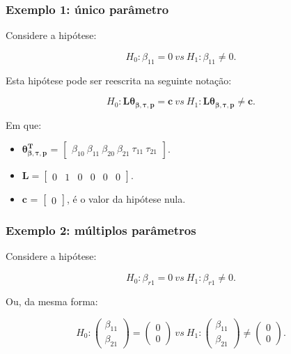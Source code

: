 \documentclass[10pt,
  aspectratio=169,
  serif,
  mathserif,
  professionalfont,
  compress,
  handout,
  ]{beamer}\usepackage[]{graphicx}\usepackage[]{color}
\begin{document}
\begin{frame}

\frametitle{Exemplo 1: único parâmetro}

Considere a hipótese:

$$H_0: \beta_{11} = 0 \ vs \ H_1: \beta_{11} \neq 0.$$

Esta hipótese pode ser reescrita na seguinte notação:

$$H_0: \boldsymbol{L}\boldsymbol{\theta_{\beta,\tau,p}} = \boldsymbol{c} \ vs \ H_1: \boldsymbol{L}\boldsymbol{\theta_{\beta,\tau,p}} \neq \boldsymbol{c}.$$ 

Em que:

\begin{itemize}
  
  \item $\boldsymbol{\theta_{\beta,\tau,p}^T}$ = $\begin{bmatrix} \beta_{10} \  \beta_{11} \ \beta_{20} \ \beta_{21} \ \tau_{11} \ \tau_{21} \end{bmatrix}$.


\item $\boldsymbol{L} = \begin{bmatrix} 0 & 1 & 0 & 0 & 0 & 0  \end{bmatrix}.$
 
\item $\boldsymbol{c}$ = $\begin{bmatrix} 0 \end{bmatrix}$, é o valor da hipótese nula. 

\end{itemize}

\end{frame}


\begin{frame}

\frametitle{Exemplo 2: múltiplos parâmetros}

Considere a hipótese:

$$H_0: \beta_{r1} = 0 \ vs \ H_1: \beta_{r1} \neq 0.$$ 

Ou, da mesma forma:

$$H_0: 
\begin{pmatrix}
\beta_{11} \\ 
\beta_{21}
\end{pmatrix} 
= 
\begin{pmatrix}
0 \\ 
0
\end{pmatrix}
\ vs \ 
H_1: 
\begin{pmatrix}
\beta_{11} \\ 
\beta_{21}
\end{pmatrix} 
\neq
\begin{pmatrix}
0 \\ 
0 
\end{pmatrix}.$$

\end{frame}
\end{document}
